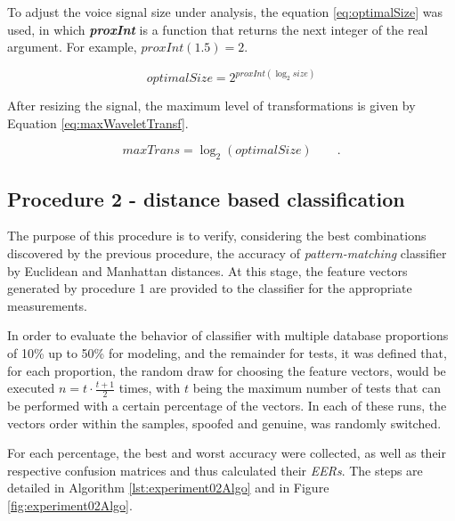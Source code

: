 			\par To adjust the voice signal size under analysis, the equation \ref{eq:optimalSize} was used, in which \textit{\textbf{proxInt}} is a function that returns the next integer of the real argument. For example, $proxInt(1.5)=2$.

			\begin{equation}
				optimalSize=2^{proxInt(\log_{2}size)}
				\label{eq:optimalSize}
			\end{equation} 
			
			\par After resizing the signal, the maximum level of transformations is given by Equation \ref{eq:maxWaveletTransf}. 
			
			\begin{equation}
				maxTrans=\log_{2}(optimalSize) \qquad.
				\label{eq:maxWaveletTransf}
			\end{equation}
			
		\subsection{Procedure 2 - distance based classification}
			\label{sec:propApproach:subsec:Experiment2}
			\par The purpose of this procedure is to verify, considering the best combinations discovered by the previous procedure, the accuracy of \textit{pattern-matching} classifier by Euclidean and Manhattan distances. At this stage, the feature vectors generated by procedure 1 are provided to the classifier for the appropriate measurements.
			
			\par In order to evaluate the behavior of classifier with multiple database proportions of 10\% up to 50\% for modeling, and the remainder for tests, it was defined that, for each proportion, the random draw for choosing the feature vectors, would be executed $n=t\cdot\frac{t+1}{2}$ times, with $t$ being the maximum number of tests that can be performed with a certain percentage of the vectors. In each of these runs, the vectors order within the samples, spoofed and genuine, was randomly switched.
			
			\par For each percentage, the best and worst accuracy were collected, as well as their respective confusion matrices and thus calculated their \textit{EERs}. The steps are detailed in Algorithm \ref{lst:experiment02Algo} and in Figure \ref{fig:experiment02Algo}.
	
